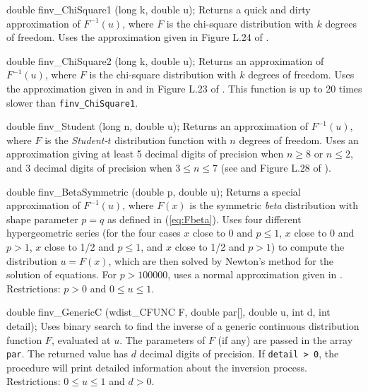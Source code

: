 double finv_ChiSquare1 (long k, double u);
\endcode
  \tab
  Returns a quick and dirty approximation of $F^{-1}(u)$, 
  where $F$ is the chi-square distribution with $k$ degrees of freedom.
  Uses the approximation given in  Figure L.24 of \cite{sBRA87a}.
 \endtab
\code


double finv_ChiSquare2 (long k, double u);
\endcode
  \tab
  Returns an approximation of $F^{-1}(u)$, where $F$ is the 
  chi-square distribution with $k$ degrees of freedom.
  Uses the approximation given in \cite{tBES75a}
  and in Figure L.23 of \cite{sBRA87a}. This function is up to
  20 times slower than {\tt finv\_ChiSquare1}.
 \endtab
\code


double finv_Student (long n, double u);
\endcode
  \tab
  Returns an approximation of $F^{-1}(u)$, where $F$ is the 
  {\em Student-$t$\/} distribution function with $n$ degrees of freedom.
  Uses an approximation giving at least 
  5 decimal digits of precision when $n \ge 8$ or $n\le 2$, and
  3 decimal digits of precision when $3\le n \le 7$
  (see \cite{tHIL70a} and Figure L.28 of \cite{sBRA87a}).
  \endtab
\code


double finv_BetaSymmetric (double p, double u);
\endcode
  \tab
  Returns a special approximation of $F^{-1}(u)$, where $F(x)$ is the 
  symmetric {\it beta} distribution with shape parameter $p = q$
  as defined in (\ref{eq:Fbeta}). Uses four different hypergeometric series 
  (for the four cases $x$ close to 0 and $p \le 1$,
     $x$ close to 0 and $p > 1$,  $x$ close to 1/2 and $p \le 1$,
  and  $x$ close to 1/2 and $p > 1$)
  to compute the distribution $u = F(x)$,
  which are then solved by Newton's method for the solution of equations.
  For $p > 100000$, uses a normal approximation given in \cite{tPEI68a}.
  Restrictions: $p > 0$ and $0 \le u \le 1$.
 \endtab
\code


double finv_GenericC (wdist_CFUNC F, double par[], double u, int d,
                      int detail);
\endcode
  \tab
   Uses binary search to find the inverse of a generic continuous
   distribution function $F$, evaluated at $u$.
   The parameters of $F$ (if any) are passed in the array {\tt par}.
   The returned value has $d$ decimal digits of precision.
   If {\tt detail > 0}, the procedure will print detailed information
   about the inversion process.
   Restrictions: $0 \le u \le 1$ and $d>0$.
  \endtab

\newpage
\hide
\code

